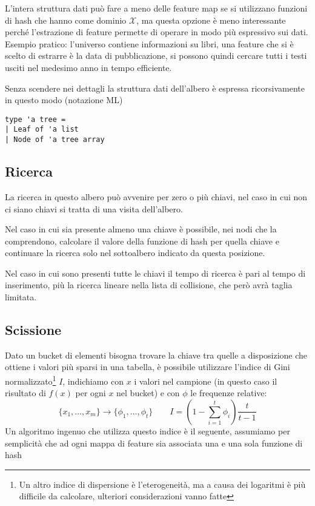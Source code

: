 \documentclass[a4paper]{article}
\begin{document}
L'intera struttura dati può fare a meno delle feature map se si utilizzano funzioni di hash che hanno come dominio $\mathcal{X}$, ma questa opzione è meno interessante perché l'estrazione di feature permette di operare in modo più espressivo sui dati. Esempio pratico: l'universo contiene informazioni su libri, una feature che si è scelto di estrarre è la data di pubblicazione, si possono quindi cercare tutti i testi usciti nel medesimo anno in tempo efficiente.

Senza scendere nei dettagli la struttura dati dell'albero è espressa ricorsivamente in questo modo (notazione ML)
\begin{verbatim}
type 'a tree =
| Leaf of 'a list
| Node of 'a tree array
\end{verbatim}

\subsection*{Ricerca}

La ricerca in questo albero può avvenire per zero o più chiavi, nel caso in cui non ci siano chiavi si tratta di una visita dell'albero.

Nel caso in cui sia presente almeno una chiave è possibile, nei nodi che la comprendono, calcolare il valore della funzione di hash per quella chiave e continuare la ricerca solo nel sottoalbero indicato da questa posizione.

Nel caso in cui sono presenti tutte le chiavi il tempo di ricerca è pari al tempo di inserimento, più la ricerca lineare nella lista di collisione, che però avrà taglia limitata.

\subsection*{Scissione}
Dato un bucket di elementi bisogna trovare la chiave tra quelle a disposizione che ottiene i valori più sparsi in una tabella, è possibile utilizzare l'indice di Gini normalizzato\footnote{Un altro indice di dispersione è l'eterogeneità, ma a causa dei logaritmi è più difficile da calcolare, ulteriori considerazioni vanno fatte} $I$, indichiamo con $x$ i valori nel campione (in questo caso il risultato di $f(x)$ per ogni $x$ nel bucket) e con $\phi$ le frequenze relative:
$$ \{ x_1, \ldots, x_m \} \rightarrow \{ \phi_1, \ldots, \phi_t \} \qquad I = \left( 1 - \sum_{i=1}^{t}\phi_i \right) \frac{t}{t - 1} $$
Un algoritmo ingenuo che utilizza questo indice è il seguente, assumiamo per semplicità che ad ogni mappa di feature sia associata una e una sola funzione di hash
\end{document}
